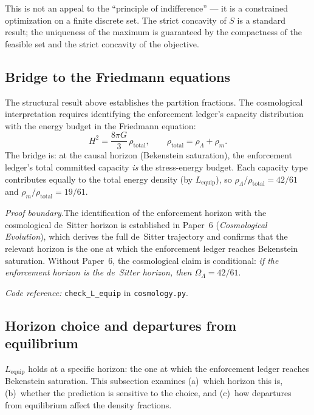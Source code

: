 \documentclass[11pt,a4paper]{article}
\theoremstyle{definition}
\newcommand{\coderef}[2]{\smallskip\noindent\textit{Code reference:} \texttt{#1} in \texttt{#2}.}
\begin{document}
\noindent This is not an appeal to the ``principle of indifference''
--- it is a constrained optimization on a finite discrete set.  The
strict concavity of $S$ is a standard result; the uniqueness of the
maximum is guaranteed by the compactness of the feasible set and the
strict concavity of the objective.


\subsection{Bridge to the Friedmann equations}
\label{sec:friedmann_bridge}

The structural result above establishes the partition fractions.  The
cosmological interpretation requires identifying the enforcement
ledger's capacity distribution with the energy budget in the Friedmann
equation:
\begin{equation}
  H^2 = \frac{8\pi G}{3}\,\rho_{\mathrm{total}},
  \qquad \rho_{\mathrm{total}} = \rho_\Lambda + \rho_m.
\end{equation}
The bridge is: at the causal horizon (Bekenstein saturation), the
enforcement ledger's total committed capacity \emph{is} the
stress-energy budget.  Each capacity type contributes equally to the
total energy density (by $L_{\mathrm{equip}}$), so
$\rho_\Lambda / \rho_{\mathrm{total}} = 42/61$ and
$\rho_m / \rho_{\mathrm{total}} = 19/61$.

\textit{Proof boundary.}\quad The identification of the enforcement
horizon with the cosmological de~Sitter horizon is established in
Paper~6 (\emph{Cosmological Evolution}), which derives the full
de~Sitter trajectory and confirms that the relevant horizon is the
one at which the enforcement ledger reaches Bekenstein saturation.
Without Paper~6, the cosmological claim is conditional: \emph{if the
enforcement horizon is the de~Sitter horizon, then
$\Omega_\Lambda = 42/61$}.

\coderef{check\_L\_equip}{cosmology.py}

\subsection{Horizon choice and departures from equilibrium}
\label{sec:horizon_sensitivity}

$L_{\mathrm{equip}}$ holds at a specific horizon: the one at which the
enforcement ledger reaches Bekenstein saturation.  This subsection
examines (a)~which horizon this is, (b)~whether the prediction is
sensitive to the choice, and (c)~how departures from equilibrium affect
the density fractions.
\end{document}
